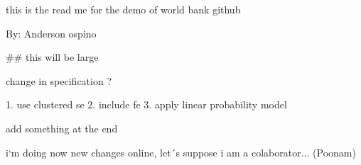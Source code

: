 this is the read me for the demo of world bank github

By: Anderson ospino

## this will be large



change in specification ?

1. use clustered se
2. include fe
3. apply linear probability model

add something at the end


i`m doing now new changes online, let´s suppose i am a colaborator... (Poonam)

